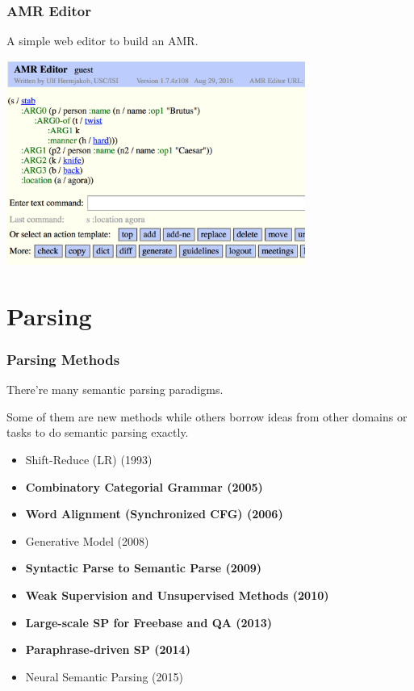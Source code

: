 \documentclass{beamer}
\begin{document}
\begin{frame}
    \frametitle{AMR Editor}

    A simple web editor to build an AMR.

    \begin{center}
        \includegraphics[height=6.7cm,width=9.8cm]{img/amr-editor.png}
    \end{center}
\end{frame}

\section{Parsing}

\begin{frame}
    \frametitle{Parsing Methods}

    There're many semantic parsing paradigms.

    Some of them are new methods while others borrow ideas from other domains or
    tasks to do semantic parsing exactly.

    \begin{itemize}
        \item Shift-Reduce (LR) (1993)
        \item {\bf Combinatory Categorial Grammar (2005)}
        \item {\bf Word Alignment (Synchronized CFG) (2006)}
        \item Generative Model (2008)
        \item {\bf Syntactic Parse to Semantic Parse (2009)}
        \item {\bf Weak Supervision and Unsupervised Methods (2010)}
        \item {\bf Large-scale SP for Freebase and QA (2013)}
        \item {\bf Paraphrase-driven SP (2014)}
        \item Neural Semantic Parsing (2015)
    \end{itemize}

\end{frame}
\end{document}
